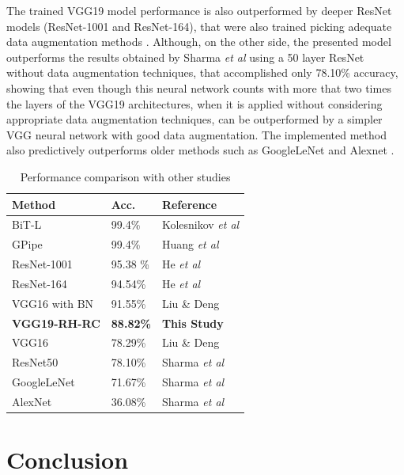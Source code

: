 \documentclass[10pt,twocolumn,letterpaper]{article}
\begin{document}
The trained VGG19 model performance is also outperformed by deeper ResNet models (ResNet-1001 and ResNet-164), that were also trained picking adequate data augmentation methods \cite{He2016a}. Although, on the other side, the presented model outperforms the results obtained by Sharma \textit{et al} \cite{Sharma2018} using a 50 layer ResNet without data augmentation techniques, that accomplished only 78.10\% accuracy, showing that even though this neural network counts with more that two times the layers of the VGG19 architectures, when it is applied without considering appropriate data augmentation techniques, can be outperformed by a simpler VGG neural network with good data augmentation. The implemented method also predictively outperforms older methods such as GoogleLeNet and Alexnet \cite{Sharma2018}.

\begin{table}[h]
	\begin{center}
		\begin{tabular}{|p{3cm}|p{1.2cm}|p{2.8cm}|}
			\hline
			Method & Acc. & Reference \\
			\hline\hline
			BiT-L & 99.4\% & Kolesnikov \textit{et al} \cite{Kolesnikov2019}  \\
			GPipe & 99.4\% & Huang \textit{et al} \cite{Huang2018}  \\
			ResNet-1001  & 95.38 \% & He \textit{et al} \cite{He2016a}  \\
			ResNet-164  & 94.54\% & He \textit{et al} \cite{He2016a}  \\
			VGG16 with BN & 91.55\% & Liu \& Deng \cite{Liu2016}  \\
			\textbf{VGG19-RH-RC} & \textbf{88.82\%} &\textbf{This Study}  \\
			VGG16 & 78.29\% &  Liu \& Deng \cite{Liu2016} \\
			ResNet50 & 78.10\% &  Sharma \textit{et al} \cite{Sharma2018} \\
			GoogleLeNet & 71.67\% &  Sharma \textit{et al} \cite{Sharma2018} \\
			AlexNet & 36.08\% &  Sharma \textit{et al} \cite{Sharma2018} \\
			\hline
		\end{tabular}
	\end{center}
	\caption{Performance comparison with other studies}
	\label{table:testcomp}
\end{table}

\section{Conclusion}
\end{document}
